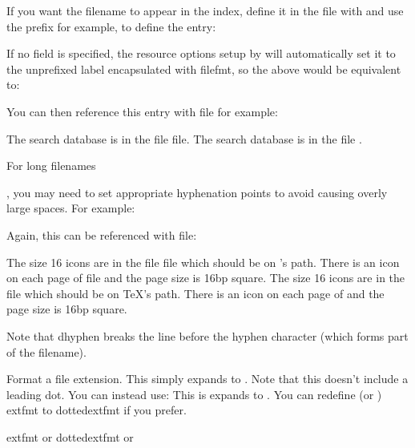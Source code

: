 \documentclass[toc=listof]{scrreport}
\begin{document}
If you want the filename to appear in the index, define it in
the  file with  and use the prefix
 for example, to define the  entry:
\begin{codebox}
\end{codebox}
If no  field is specified, the resource options setup by
 will automatically set it to the unprefixed label
encapsulated with \gls{filefmt}, so the above would be equivalent to:
\begin{codebox}
\end{codebox}
You can then reference this entry with \gls{file} for example:
\begin{coderesult}
The search database is in
the file \gls{file}.
\tcblower
The search database is in
the file .
\end{coderesult}

\hypertarget{longfilenameexample}{For long filenames}, you may need to set 
appropriate hyphenation points to avoid causing overly large spaces. For example:
\begin{codebox}
\end{codebox}
Again, this can be referenced with \gls{file}:
\begin{coderesult}
The size 16 icons are in the file
\gls{file}
which should be on 's path.
There is an icon on each page of
\gls{file}
and the page size is 16bp square.
\tcblower
The size 16 icons are in the file
which should be on \TeX's path.
There is an icon on each page of
and the page size is 16bp square.
\end{coderesult}
Note that \gls{dhyphen} breaks the line before the hyphen character
(which forms part of the filename).

Format a file extension. This simply expands to
.
Note that this doesn't include a leading dot. You can instead use:
This is expands to .
You can redefine (or ) \gls{extfmt} to 
\gls{dottedextfmt} if you prefer.
\begin{coderesult}
\gls{extfmt} or
\gls{dottedextfmt}
\tcblower
{} or
\end{coderesult}
\end{document}
